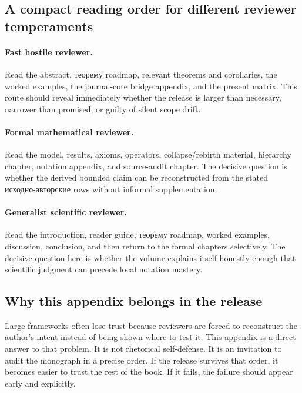 \subsection{A compact reading order for different reviewer temperaments}

\paragraph{Fast hostile reviewer.}
Read the abstract, теорему roadmap, relevant theorems and corollaries, the worked examples,
the journal-core bridge appendix, and the present matrix. This route should reveal immediately
whether the release is larger than necessary, narrower than promised, or guilty of silent scope
drift.

\paragraph{Formal mathematical reviewer.}
Read the model, results, axioms, operators, collapse/rebirth material, hierarchy chapter,
notation appendix, and source-audit chapter. The decisive question is whether the derived bounded
claim can be reconstructed from the stated исходно-авторские rows without informal supplementation.

\paragraph{Generalist scientific reviewer.}
Read the introduction, reader guide, теорему roadmap, worked examples, discussion, conclusion,
and then return to the formal chapters selectively. The decisive question here is whether the
volume explains itself honestly enough that scientific judgment can precede local notation
mastery.

\subsection{Why this appendix belongs in the release}

Large frameworks often lose trust because reviewers are forced to reconstruct the author's intent
instead of being shown where to test it. This appendix is a direct answer to that problem. It is
not rhetorical self-defense. It is an invitation to audit the monograph in a precise order.
If the release survives that order, it becomes easier to trust the rest of the book. If it fails,
the failure should appear early and explicitly.


